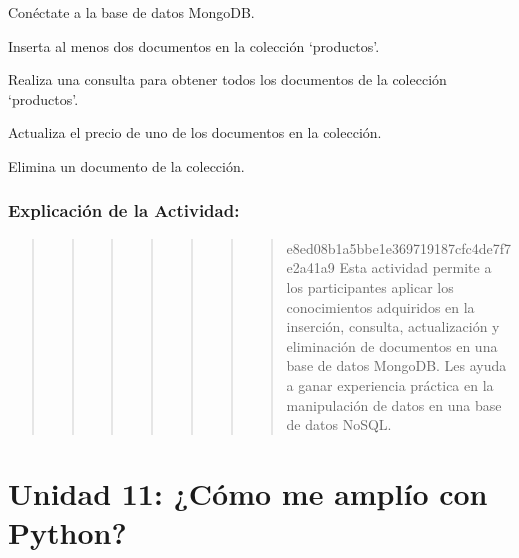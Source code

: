 \documentclass[
  a4paper,
  onepage,
  openany]{scrreprt}
\begin{document}
\begin{tcolorbox}[enhanced jigsaw, breakable, opacityback=0, toptitle=1mm, coltitle=black, toprule=.15mm, rightrule=.15mm, colframe=quarto-callout-important-color-frame, opacitybacktitle=0.6, arc=.35mm, title=\textcolor{quarto-callout-important-color}{\faExclamation}\hspace{0.5em}{Actividad Práctica:}, titlerule=0mm, colbacktitle=quarto-callout-important-color!10!white, bottomtitle=1mm, bottomrule=.15mm, colback=white, left=2mm, leftrule=.75mm]

Conéctate a la base de datos MongoDB.

Inserta al menos dos documentos en la colección `productos'.

Realiza una consulta para obtener todos los documentos de la colección
`productos'.

Actualiza el precio de uno de los documentos en la colección.

Elimina un documento de la colección.

\end{tcolorbox}

\hypertarget{explicaciuxf3n-de-la-actividad-77}{%
\section{Explicación de la
Actividad:}\label{explicaciuxf3n-de-la-actividad-77}}

\begin{quote}
\begin{quote}
\begin{quote}
\begin{quote}
\begin{quote}
\begin{quote}
\begin{quote}
e8ed08b1a5bbe1e369719187cfc4de7f7e2a41a9 Esta actividad permite a los
participantes aplicar los conocimientos adquiridos en la inserción,
consulta, actualización y eliminación de documentos en una base de datos
MongoDB. Les ayuda a ganar experiencia práctica en la manipulación de
datos en una base de datos NoSQL.
\end{quote}
\end{quote}
\end{quote}
\end{quote}
\end{quote}
\end{quote}
\end{quote}

\part{Unidad 11: ¿Cómo me amplío con Python?}
\end{document}

